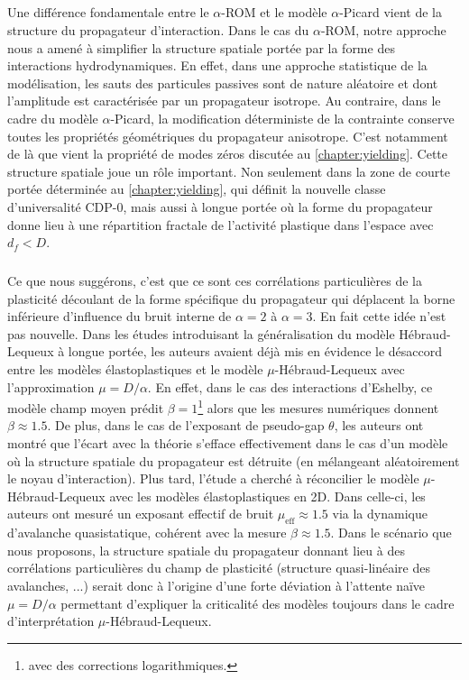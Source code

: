 \subparagraph{}Une différence fondamentale entre le $\alpha$-ROM et le modèle $\alpha$-Picard vient de la structure du propagateur d'interaction. Dans le cas du $\alpha$-ROM, notre approche nous a amené à simplifier la structure spatiale portée par la forme des interactions hydrodynamiques. En effet, dans une approche statistique de la modélisation, les sauts des particules passives sont de nature aléatoire et dont l'amplitude est caractérisée par un propagateur isotrope. Au contraire, dans le cadre du modèle $\alpha$-Picard, la modification déterministe de la contrainte conserve toutes les propriétés géométriques du propagateur anisotrope. C'est notamment de là que vient la propriété de modes zéros discutée au \autoref{chapter:yielding}. Cette structure spatiale joue un rôle important. Non seulement dans la zone de courte portée déterminée au \autoref{chapter:yielding}, qui définit la nouvelle classe d'universalité CDP-0, mais aussi à longue portée où la forme du propagateur donne lieu à une répartition fractale de l'activité plastique dans l'espace avec $d_f < D$.

\subparagraph{}Ce que nous suggérons, c'est que ce sont ces corrélations particulières de la plasticité découlant de la forme spécifique du propagateur qui déplacent la borne inférieure d’influence du bruit interne de $\alpha = 2$ à $\alpha = 3$. En fait cette idée n'est pas nouvelle. Dans les études \cite{lin_mean_field_2016, lin_microscopic_2018} introduisant la généralisation du modèle Hébraud-Lequeux à longue portée, les auteurs avaient déjà mis en évidence le désaccord entre les modèles élastoplastiques et le modèle $\mu$-Hébraud-Lequeux avec l'approximation $\mu = D/\alpha$. En effet, dans le cas des interactions d'Eshelby, ce modèle champ moyen prédit $\beta = 1$\footnote{avec des corrections logarithmiques.} alors que les mesures numériques donnent $\beta \approx 1.5$. De plus, dans le cas de l'exposant de pseudo-gap $\theta$, les auteurs ont montré que l'écart avec la théorie s'efface effectivement dans le cas d'un modèle où la structure spatiale du propagateur est détruite (en mélangeant aléatoirement le noyau d'interaction). Plus tard, l'étude \cite{ferrero_criticality_2019} a cherché à réconcilier le modèle $\mu$-Hébraud-Lequeux avec les modèles élastoplastiques en 2D. Dans celle-ci, les auteurs ont mesuré un exposant effectif de bruit $\mu_\text{eff}\approx 1.5$ via la dynamique d'avalanche quasistatique, cohérent avec la mesure $\beta \approx 1.5$. Dans le scénario que nous proposons, la structure spatiale du propagateur donnant lieu à des corrélations particulières du champ de plasticité (structure quasi-linéaire des avalanches, ...) serait donc à l'origine d'une forte déviation à l'attente naïve $\mu = D/\alpha$ permettant d'expliquer la criticalité des modèles toujours dans le cadre d'interprétation $\mu$-Hébraud-Lequeux.

